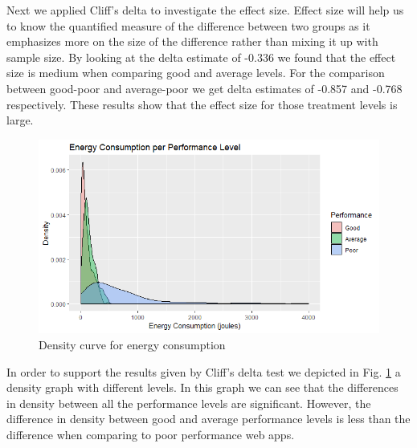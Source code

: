 Next we applied Cliff's delta to investigate the effect size. Effect size will help us to know the quantified measure of the difference between two groups as it emphasizes more on the size of the difference rather than mixing it up with sample size. By looking at the delta estimate of -0.336  we found that the effect size is medium when comparing good and average levels. For the comparison between good-poor and average-poor we get delta estimates of -0.857 and -0.768 respectively. These results show that the effect size for those treatment levels is large.

\begin{figure}[H]
  \includegraphics[width=\linewidth]{./NewImages/Fig_11_Density_Curve_Energy_Consumption.png}
  \caption{Density curve for energy consumption}
  \label{fig:density-levels}
\end{figure}

In order to support the results given by Cliff's delta test we depicted in Fig. \ref{fig:density-levels} a density graph with different levels. In this graph we can see that the differences in density between all the performance levels are significant.  However,  the difference in density between good and average performance levels is less than the difference when comparing to poor performance web apps.  
